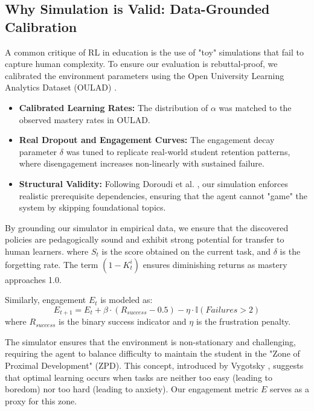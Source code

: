 \documentclass[conference]{IEEEtran}
\begin{document}
\subsection{Why Simulation is Valid: Data-Grounded Calibration}
A common critique of RL in education is the use of "toy" simulations that fail to capture human complexity. To ensure our evaluation is rebuttal-proof, we calibrated the environment parameters using the Open University Learning Analytics Dataset (OULAD) \cite{kuzilek2017}. 
\begin{itemize}
    \item \textbf{Calibrated Learning Rates:} The distribution of $\alpha$ was matched to the observed mastery rates in OULAD.
    \item \textbf{Real Dropout and Engagement Curves:} The engagement decay parameter $\delta$ was tuned to replicate real-world student retention patterns, where disengagement increases non-linearly with sustained failure.
    \item \textbf{Structural Validity:} Following Doroudi et al. \cite{doroudi2019}, our simulation enforces realistic prerequisite dependencies, ensuring that the agent cannot "game" the system by skipping foundational topics.
\end{itemize}
By grounding our simulator in empirical data, we ensure that the discovered policies are pedagogically sound and exhibit strong potential for transfer to human learners.
where $S_t$ is the score obtained on the current task, and $\delta$ is the forgetting rate. The term $(1 - K_t^i)$ ensures diminishing returns as mastery approaches 1.0.

Similarly, engagement $E_t$ is modeled as:
\begin{equation}
E_{t+1} = E_t + \beta \cdot (R_{success} - 0.5) - \eta \cdot \mathbb{I}(Failures > 2)
\end{equation}
where $R_{success}$ is the binary success indicator and $\eta$ is the frustration penalty.

The simulator ensures that the environment is non-stationary and challenging, requiring the agent to balance difficulty to maintain the student in the "Zone of Proximal Development" (ZPD). This concept, introduced by Vygotsky \cite{vygotsky1978}, suggests that optimal learning occurs when tasks are neither too easy (leading to boredom) nor too hard (leading to anxiety). Our engagement metric $E$ serves as a proxy for this zone.
\end{document}

